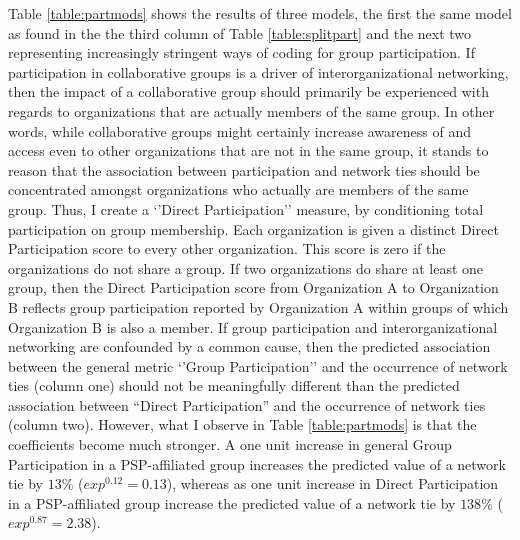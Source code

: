 \documentclass[12pt,a4paper,titlepage]{article}
\begin{document}
Table \ref{table:partmods} shows the results of three models, the first the same model as found in the the third column of Table \ref{table:splitpart} and the next two representing increasingly stringent ways of coding for group participation. If participation in collaborative groups is a driver of interorganizational networking, then the impact of a collaborative group should primarily be experienced with regards to organizations that are actually members of the same group. In other words, while collaborative groups might certainly increase awareness of and access even to other organizations that are not in the same group, it stands to reason that the association between participation and network ties should be concentrated amongst organizations who actually are members of the same group. Thus, I create a ‘’Direct Participation’’ measure, by conditioning total participation on group membership. Each organization is given a distinct Direct Participation score to every other organization. This score is zero if the organizations do not share a group. If two organizations do share at least one group, then the Direct Participation score from Organization A to Organization B reflects group participation reported by Organization A within groups of which Organization B is also a member. If group participation and interorganizational networking are confounded by a common cause, then the predicted association between the general metric `'Group Participation'' and the occurrence of network ties (column one) should not be meaningfully different than the predicted association between “Direct Participation” and the occurrence of network ties (column two). However, what I observe in Table \ref{table:partmods} is that the coefficients become much stronger. A one unit increase in general Group Participation in a PSP-affiliated group increases the predicted value of a network tie by $13\%$ ($exp^{0.12} = 0.13$), whereas as one unit increase in Direct Participation in a PSP-affiliated group increase the predicted value of a network tie by $138\%$ ($exp^{0.87} = 2.38$).
\end{document}
